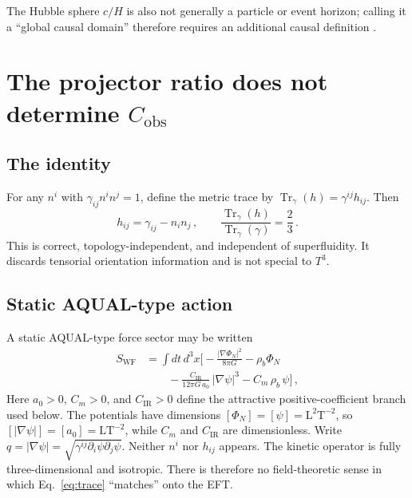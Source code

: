 \documentclass[aps,prd,reprint,superscriptaddress,nofootinbib,floatfix,showkeys]{revtex4-2}
\newcommand{\Tthree}{T^{3}}
\newcommand{\Cobs}{C_{\mathrm{obs}}}
\newcommand{\Cm}{C_{m}}
\newcommand{\CIR}{C_{\mathrm{IR}}}
\newcommand{\azero}{a_{0}}
\begin{document}
The Hubble sphere \(c/H\) is also not generally a particle or event horizon;
calling it a ``global causal domain'' therefore requires an additional causal
definition \cite{davis_lineweaver_horizon}.

\section{The projector ratio does not determine
\texorpdfstring{\(\Cobs\)}{C\_obs}}
\label{sec:proj}

\subsection{The identity}

For any \(n^{i}\) with \(\gamma_{ij}n^i n^j=1\), define the metric
trace by \(\operatorname{Tr}_{\gamma}(h)=\gamma^{ij}h_{ij}\). Then
\begin{equation}
  h_{ij}=\gamma_{ij}-n_{i}n_{j}\,,
  \qquad
  \frac{\operatorname{Tr}_{\gamma}(h)}{\operatorname{Tr}_{\gamma}(\gamma)}
  =\frac{2}{3}\,.
  \label{eq:trace}
\end{equation}
This is correct, topology-independent, and independent of superfluidity.  It
discards tensorial orientation information and is not special to \(\Tthree\).

\subsection{Static AQUAL-type action}

A static AQUAL-type force sector \cite{bekenstein_milgrom} may be written
\begin{align}
  S_{\mathrm{WF}}
  &= \int\! dt\,d^{3}x
  \Biggl[
  -\frac{|\nabla\Phi_{N}|^{2}}{8\pi G}
  - \rho_{b}\Phi_{N}
  \nonumber\\
  &\qquad
  - \frac{\CIR}{12\pi G\,\azero}\,|\nabla\psi|^{3}
  - \Cm\,\rho_{b}\,\psi
  \Biggr]\,,
  \label{eq:SWF}
\end{align}
Here \(\azero>0\), \(\Cm>0\), and \(\CIR>0\) define the attractive
positive-coefficient branch used below. The potentials have dimensions
\([\Phi_N]=[\psi]=\mathrm{L}^2\mathrm{T}^{-2}\), so
\([|\nabla\psi|]=[\azero]=\mathrm{L}\mathrm{T}^{-2}\), while \(\Cm\)
and \(\CIR\) are dimensionless. Write
\(q=|\nabla\psi|=\sqrt{\gamma^{ij}\partial_{i}\psi\partial_{j}\psi}\).
Neither \(n^{i}\) nor \(h_{ij}\) appears.  The kinetic operator is fully
three-dimensional and isotropic.  There is therefore no field-theoretic sense
in which Eq.~\eqref{eq:trace} ``matches'' onto the EFT.
\end{document}
